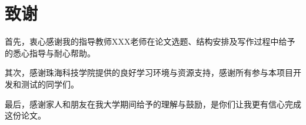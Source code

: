 \section*{致谢}

首先，衷心感谢我的指导教师XXX老师在论文选题、结构安排及写作过程中给予的悉心指导与耐心帮助。

其次，感谢珠海科技学院提供的良好学习环境与资源支持，感谢所有参与本项目开发和测试的同学们。

最后，感谢家人和朋友在我大学期间给予的理解与鼓励，是你们让我更有信心完成这份论文。
